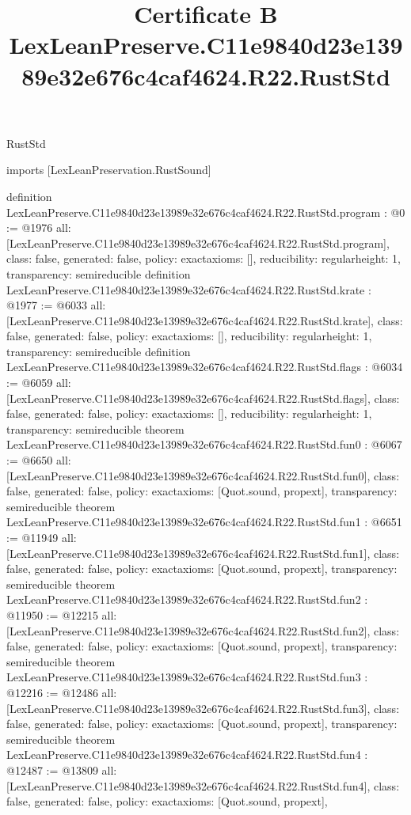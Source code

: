 \begin{lexlean}{RustStd}
\title{Certificate B LexLeanPreserve.C11e9840d23e13989e32e676c4caf4624.R22.RustStd}
\begin{coremodule}
imports [LexLeanPreservation.RustSound]

definition LexLeanPreserve.C11e9840d23e13989e32e676c4caf4624.R22.RustStd.program : @0 := @1976 {
  all: [LexLeanPreserve.C11e9840d23e13989e32e676c4caf4624.R22.RustStd.program],
  class: false,
  generated: false,
  policy: exact{axioms: []},
  reducibility: regular{height: 1},
  transparency: semireducible
}
definition LexLeanPreserve.C11e9840d23e13989e32e676c4caf4624.R22.RustStd.krate : @1977 := @6033 {
  all: [LexLeanPreserve.C11e9840d23e13989e32e676c4caf4624.R22.RustStd.krate],
  class: false,
  generated: false,
  policy: exact{axioms: []},
  reducibility: regular{height: 1},
  transparency: semireducible
}
definition LexLeanPreserve.C11e9840d23e13989e32e676c4caf4624.R22.RustStd.flags : @6034 := @6059 {
  all: [LexLeanPreserve.C11e9840d23e13989e32e676c4caf4624.R22.RustStd.flags],
  class: false,
  generated: false,
  policy: exact{axioms: []},
  reducibility: regular{height: 1},
  transparency: semireducible
}
theorem LexLeanPreserve.C11e9840d23e13989e32e676c4caf4624.R22.RustStd.fun0 : @6067 := @6650 {
  all: [LexLeanPreserve.C11e9840d23e13989e32e676c4caf4624.R22.RustStd.fun0],
  class: false,
  generated: false,
  policy: exact{axioms: [Quot.sound, propext]},
  transparency: semireducible
}
theorem LexLeanPreserve.C11e9840d23e13989e32e676c4caf4624.R22.RustStd.fun1 : @6651 := @11949 {
  all: [LexLeanPreserve.C11e9840d23e13989e32e676c4caf4624.R22.RustStd.fun1],
  class: false,
  generated: false,
  policy: exact{axioms: [Quot.sound, propext]},
  transparency: semireducible
}
theorem LexLeanPreserve.C11e9840d23e13989e32e676c4caf4624.R22.RustStd.fun2 : @11950 := @12215 {
  all: [LexLeanPreserve.C11e9840d23e13989e32e676c4caf4624.R22.RustStd.fun2],
  class: false,
  generated: false,
  policy: exact{axioms: [Quot.sound, propext]},
  transparency: semireducible
}
theorem LexLeanPreserve.C11e9840d23e13989e32e676c4caf4624.R22.RustStd.fun3 : @12216 := @12486 {
  all: [LexLeanPreserve.C11e9840d23e13989e32e676c4caf4624.R22.RustStd.fun3],
  class: false,
  generated: false,
  policy: exact{axioms: [Quot.sound, propext]},
  transparency: semireducible
}
theorem LexLeanPreserve.C11e9840d23e13989e32e676c4caf4624.R22.RustStd.fun4 : @12487 := @13809 {
  all: [LexLeanPreserve.C11e9840d23e13989e32e676c4caf4624.R22.RustStd.fun4],
  class: false,
  generated: false,
  policy: exact{axioms: [Quot.sound, propext]},
}
\end{coremodule}
\end{lexlean}
